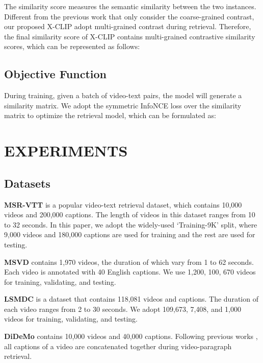 \documentclass[sigconf]{acmart}
\begin{document}
The similarity score  measures the semantic similarity between the two instances. Different from the previous work \cite{luo2021clip4clip} that only consider the coarse-grained contrast, our proposed X-CLIP adopt multi-grained contrast during retrieval. Therefore, the final similarity score  of X-CLIP contains multi-grained contrastive similarity scores, which can be represented as follows:


\subsection{Objective Function} \label{sec:objective}
During training, given a batch of  video-text pairs, the model will generate a  similarity matrix. We adopt the symmetric InfoNCE loss over the similarity matrix to optimize the retrieval model, which can be formulated as:







\section{EXPERIMENTS}

\subsection{Datasets}

\noindent\textbf{MSR-VTT} \cite{xu2016msr} is a popular video-text retrieval dataset, which contains 10,000 videos and 200,000 captions. The length of videos in this dataset ranges from 10 to 32 seconds. In this paper, we adopt the widely-used `Training-9K' split, where 9,000 videos and 180,000 captions are used for training and the rest are used for testing.

\noindent\textbf{MSVD}
 \cite{chen2011collecting} contains 1,970 videos, the duration of which vary from 1 to 62 seconds. Each video is annotated with 40 English captions. We use 1,200, 100, 670 videos for training, validating, and testing. 

\noindent\textbf{LSMDC} \cite{rohrbach2015long} is a dataset that contains 118,081 videos and captions. The duration of each video ranges from 2 to 30 seconds. We adopt 109,673, 7,408, and 1,000 videos for training, validating, and testing.

\noindent\textbf{DiDeMo}  \cite{anne2017localizing} contains 10,000 videos and 40,000 captions. Following previous works \cite{liu2019use,lei2021less,bain2021frozen}, all captions of a video are concatenated together during video-paragraph retrieval.
\end{document}
